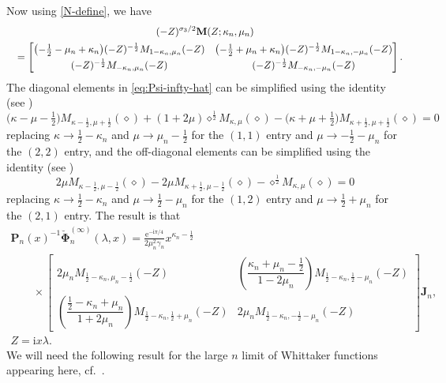 \documentclass[11pt]{article}
\numberwithin{equation}{section}
\numberwithin{equation}{section}
\newcommand{\ee}{\mathrm{e}}
\newcommand{\ii}{\mathrm{i}}
\newcommand{\para}[1]{\breve{#1}}
\begin{document}
Now using \eqref{N-define}, we have
\begin{gather*}
 (-Z)^{\sigma_3/2}\mathbf{M}(Z;\kappa_n,\mu_n) \\
 \quad=
 \begin{bmatrix}
 \bigl(-\frac{1}{2} - \mu_n+\kappa_n\bigr)(-Z)^{-\frac{1}{2}}M_{1-\kappa_n,\mu_n}(-Z) & \bigl(-\frac{1}{2}+\mu_n+\kappa_n\bigr)(-Z)^{-\frac{1}{2}}M_{1-\kappa_n,-\mu_n}(-Z)\vspace{1mm}\\
 (-Z)^{-\frac{1}{2}}M_{-\kappa_n,\mu_n}(-Z) & (-Z)^{-\frac{1}{2}}M_{-\kappa_n,-\mu_n}(-Z)
 \end{bmatrix}.
\end{gather*}
The diagonal elements in \eqref{eq:Psi-infty-hat} can be simplified using the identity (see \cite[equation~(13.15.3)]{DLMF})
\begin{equation*}
 \big(\kappa-\mu-\tfrac{1}{2}\big)M_{\kappa-\frac{1}{2},\mu+\frac{1}{2}}(\diamond)+(1+2\mu)\diamond^{\frac{1}{2}}M_{\kappa,\mu}(\diamond) -\big(\kappa+\mu+\tfrac{1}{2}\big)M_{\kappa+\frac{1}{2},\mu+\frac{1}{2}}(\diamond)=0
\end{equation*}
replacing $\kappa\to\frac{1}{2}-\kappa_n$ and $\mu\to\mu_n-\frac{1}{2}$ for the $(1,1)$ entry and $\mu\to-\frac{1}{2}-\mu_n$ for the $(2,2)$ entry,
and the off-diagonal elements can be simplified using the identity (see \cite[equation~(13.15.4)]{DLMF})
\begin{equation*}
 2\mu M_{\kappa-\frac{1}{2},\mu-\frac{1}{2}}(\diamond)-2\mu M_{\kappa+\frac{1}{2},\mu-\frac{1}{2}}(\diamond)-\diamond^{\frac{1}{2}}M_{\kappa,\mu}(\diamond)=0
\end{equation*}
replacing $\kappa \to \frac{1}{2}-\kappa_n$ and $\mu\to\frac{1}{2}-\mu_n$ for the $(1,2)$ entry and $\mu\to\frac{1}{2}+\mu_n$ for the $(2,1)$ entry. The result is that
\begin{gather}
 \mathbf{P}_n(x)^{-1}\para{\mathbf{\Phi}}_n^{(\infty)}(\lambda,x)
 =\frac{\ee^{-\ii\pi/4}}{2 \mu_n^2 \gamma_n}x^{\kappa_n-\frac{1}{2}}\nonumber\\
 \qquad {}\times\begin{bmatrix}2\mu_n M_{\frac{1}{2}-\kappa_n,\mu_n-\frac{1}{2}}(-Z) & \left(\dfrac{\kappa_n + \mu_n - \frac{1}{2}}{1 - 2\mu_n}\right) M_{\frac{1}{2}-\kappa_n,\frac{1}{2}-\mu_n}(-Z) \\
 \left(\dfrac{\frac{1}{2} - \kappa_n + \mu_n}{1 + 2\mu_n}\right)M_{\frac{1}{2}-\kappa_n,\frac{1}{2}+\mu_n}(-Z) & 2\mu_n M_{\frac{1}{2}-\kappa_n,-\frac{1}{2}-\mu_n}(-Z)\end{bmatrix}\mathbf{J}_n,\nonumber\\ Z=\ii x\lambda.
 \label{eq:Psi-infty-hat-1}
\end{gather}
We will need the following result for the large $n$ limit of Whittaker functions appearing here, cf.~\cite[equation~(13.21.1)]{DLMF}.
\end{document}
